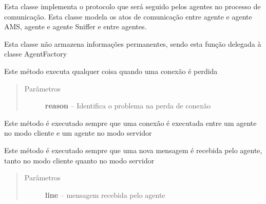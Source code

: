 \documentclass[letterpaper,10pt,brazil]{sphinxmanual}
\begin{document}

\begin{fulllineitems}
\label{api:pade.core.agent.AgentProtocol}
Esta classe implementa o protocolo que será seguido pelos
agentes no processo de comunicação. Esta classe modela os
atos de comunicação entre agente e agente AMS, agente e
agente Sniffer e entre agentes.

Esta classe não armazena informações permanentes, sendo
esta função delegada à classe AgentFactory

\begin{fulllineitems}
\label{api:pade.core.agent.AgentProtocol.connectionLost}
Este método executa qualquer coisa quando uma conexão é perdida
\begin{quote}\begin{description}
\item[{Parâmetros}] \leavevmode
\textbf{reason} -- Identifica o problema na perda de conexão

\end{description}\end{quote}

\end{fulllineitems}


\begin{fulllineitems}
\label{api:pade.core.agent.AgentProtocol.connectionMade}
Este método é executado sempre que uma
conexão é executada entre um agente no modo
cliente e um agente no modo servidor

\end{fulllineitems}


\begin{fulllineitems}
\label{api:pade.core.agent.AgentProtocol.lineReceived}
Este método é executado sempre que uma
nova mensagem é recebida pelo agente, 
tanto no modo cliente quanto no modo servidor
\begin{quote}\begin{description}
\item[{Parâmetros}] \leavevmode
\textbf{line} -- mensagem recebida pelo agente


\end{description}
\end{quote}
\end{fulllineitems}
\end{fulllineitems}
\end{document}
